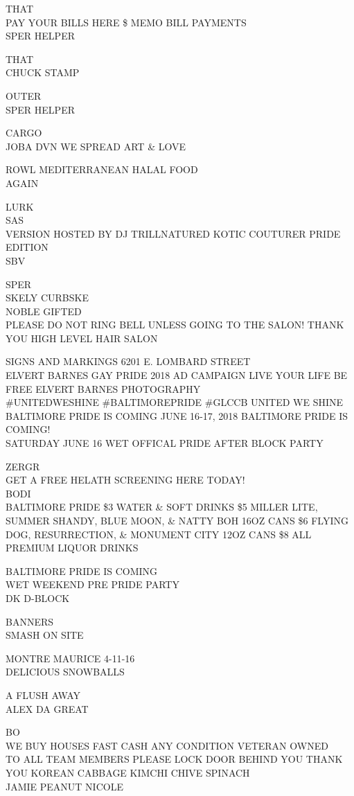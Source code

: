 \documentclass[10pt,letterpaper]{article}
\begin{document}
THAT\\
PAY YOUR BILLS HERE \$ MEMO BILL PAYMENTS\\
SPER HELPER

THAT\\
CHUCK STAMP

OUTER\\
SPER HELPER

CARGO\\
JOBA DVN WE SPREAD ART \& LOVE

ROWL MEDITERRANEAN HALAL FOOD\\
AGAIN

LURK\\
SAS\\
VERSION HOSTED BY DJ TRILLNATURED KOTIC COUTURER PRIDE EDITION\\
SBV

SPER\\
SKELY CURBSKE\\
NOBLE GIFTED\\
PLEASE DO NOT RING BELL UNLESS GOING TO THE SALON!  THANK YOU  HIGH LEVEL HAIR SALON

SIGNS AND MARKINGS 6201 E. LOMBARD STREET\\
ELVERT BARNES GAY PRIDE 2018 AD CAMPAIGN LIVE YOUR LIFE BE FREE ELVERT BARNES PHOTOGRAPHY\\
\#UNITEDWESHINE \#BALTIMOREPRIDE \#GLCCB UNITED WE SHINE BALTIMORE PRIDE IS COMING JUNE 16{-}17, 2018 BALTIMORE PRIDE IS COMING!\\
SATURDAY JUNE 16 WET OFFICAL PRIDE AFTER BLOCK PARTY

ZERGR\\
GET A FREE HELATH SCREENING HERE TODAY!\\
BODI\\
BALTIMORE PRIDE \$3 WATER \& SOFT DRINKS \$5 MILLER LITE, SUMMER SHANDY, BLUE MOON, \& NATTY BOH 16OZ CANS \$6 FLYING DOG, RESURRECTION, \& MONUMENT CITY 12OZ CANS \$8 ALL PREMIUM LIQUOR DRINKS

BALTIMORE PRIDE IS COMING\\
WET WEEKEND PRE PRIDE PARTY\\
DK D{-}BLOCK

BANNERS\\
SMASH ON SITE

MONTRE MAURICE 4{-}11{-}16\\
DELICIOUS SNOWBALLS

A FLUSH AWAY\\
ALEX DA GREAT

BO\\
WE BUY HOUSES FAST CASH ANY CONDITION VETERAN OWNED\\
TO ALL TEAM MEMBERS PLEASE LOCK DOOR BEHIND YOU THANK YOU KOREAN CABBAGE KIMCHI CHIVE SPINACH\\
JAMIE PEANUT NICOLE
\end{document}
